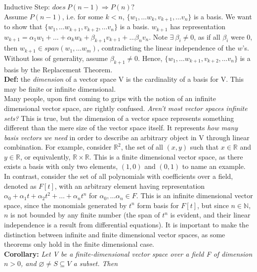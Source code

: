 \documentclass[12pt]{article}
\begin{document}
Inductive Step: $does\ P(n-1) \Rightarrow P(n)?$\\
Assume $P(n - 1)$, i.e. for some $k < n$, $\{ w_1, \dots w_k, v_{k + 1}, \dots v_n \}$ is a basis. We want to show that $\{ w_1, \dots w_{k + 1}, v_{k + 2}, \dots v_n \}$ is a basis. $w_{k + 1}$ has representation $w_{k + 1} = \alpha_1 w_1 + \dots + \alpha_k w_k + \beta_{k + 1} v_{k + 1} + \dots \beta_{n} v_n$. Note $\exists\ \beta_i \neq 0$, as if all $\beta_i$ were $0$, then $w_{k + 1} \in span(w_1, \dots w_m)$, contradicting the linear independence of the $w$'s. Without loss of generality, assume $\beta_{k + 1} \neq 0$. Hence, $\{ w_1, \dots w_{k + 1}, v_{k + 2}, \dots v_n \}$ is a basis by the Replacement Theorem.\\

\textbf{Def: }the \emph{dimension} of a vector space V is the cardinality of a basis for V. This may be finite or infinite dimensional.\\

Many people, upon first coming to grips with the notion of an infinite dimensional vector space, are rightly confused. \emph{Aren't most vector spaces infinite sets?} This is true, but the dimension of a vector space represents something different than the mere size of the vector space itself. It represents \emph{how many basis vectors we need} in order to describe an arbitrary object in V through linear combination.
\clearpage
For example, consider $\mathbb{R}^2$, the set of all $(x, y)$ such that $x \in \mathbb{R}$ and $y \in \mathbb{R}$, or equivalently, $\mathbb{R} \times \mathbb{R}$. This is a finite dimensional vector space, as there exists a basis with only two elements, $(1, 0)$ and $(0, 1)$ to name an example.\\

In contrast, consider the set of all polynomials with coefficients over a field, denoted as $F[t]$, with an arbitrary element having representation $\alpha_0 + \alpha_1 t + \alpha_2 t^2 + \dots + \alpha_n t^n$ for $\alpha_0, \dots \alpha_n \in F$. This is an infinite dimensional vector space, since the monomials generated by $t^n$ form basis for $F[t]$, but since $n \in \mathbb{N}$, $n$ is not bounded by any finite number (the span of $t^n$ is evident, and their linear independence is a result from differential equations). It is important to make the distinction between infinite and finite dimensional vector spaces, as some theorems only hold in the finite dimensional case.\\

\textbf{Corollary: }\emph{Let V be a finite-dimensional vector space over a field F of dimension $n  > 0$, and $\varnothing \neq S \subseteq V$ a subset. Then}
\end{document}
